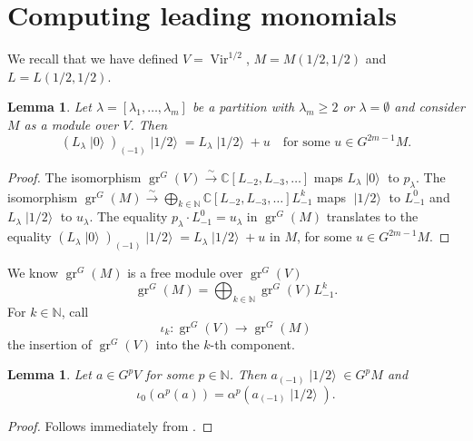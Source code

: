 \documentclass[a4paper, 12pt, reqno]{amsart}
\newtheorem{lemma}[theorem]{Lemma}
\theoremstyle{remark}
\DeclareMathOperator{\Vir}{Vir}
\DeclareMathOperator{\gr}{gr}
\DeclareMathOperator{\vac}{|0\rangle}
\DeclareMathOperator{\vachalf}{|1/2\rangle}
\begin{document}
\section{Computing leading monomials}
\label{sec:comp-lead-monom}

We recall that we have defined $V = \Vir^{1/2}$, $M = M(1/2, 1/2)$ and $L = L(1/2, 1/2)$.

\begin{lemma}
  \label{lmm:7}
  Let $\lambda = [\lambda_1, \dots, \lambda_m]$ be a partition with $\lambda_m \ge 2$ or $\lambda = \emptyset$ and consider $M$ as a module over $V$.
  Then
  \begin{equation*}
    (L_{\lambda}\vac)_{(-1)}\vachalf = L_{\lambda}\vachalf + u \quad \text{for some }u \in G^{2m - 1}M.
  \end{equation*}
\end{lemma}

\begin{proof}
  The isomorphism $\gr^G(V) \xrightarrow{\sim} \mathbb{C}[L_{-2}, L_{-3}, \dots]$ maps $L_{\lambda}\vac$ to $p_{\lambda}$.
  The isomorphism $\gr^G(M) \xrightarrow{\sim} \bigoplus_{k \in \mathbb{N}}\mathbb{C}[L_{-2}, L_{-3}, \dots]L_{-1}^k$ maps $\vachalf$ to $L_{-1}^0$ and $L_{\lambda}\vachalf$ to $u_{\lambda}$.
  The equality $p_{\lambda}\cdot L_{-1}^0 = u_{\lambda}$ in $\gr^G(M)$ translates to the equality $(L_{\lambda}\vac)_{(-1)}\vachalf = L_{\lambda}\vachalf + u$ in $M$, for some $u \in G^{2m - 1}M$.
\end{proof}

We know $\gr^G(M)$ is a free module over $\gr^G(V)$
\begin{equation*}
  \gr^G(M) = \bigoplus_{k \in \mathbb{N}}\gr^G(V)L_{-1}^k.
\end{equation*}
For $k \in \mathbb{N}$, call
\begin{equation*}
  \iota_k: \gr^G(V) \to \gr^G(M)
\end{equation*}
the insertion of $\gr^G(V)$ into the $k$-th component.

\begin{lemma}
  \label{lmm:8}
  Let $a \in G^pV$ for some $p \in \mathbb{N}$.
  Then $a_{(-1)}\vachalf \in G^pM$ and
  \begin{equation*}
    \iota_0(\alpha^p(a)) = \alpha^p(a_{(-1)}\vachalf).
  \end{equation*}
\end{lemma}

\begin{proof}
  Follows immediately from .
\end{proof}
\end{document}
